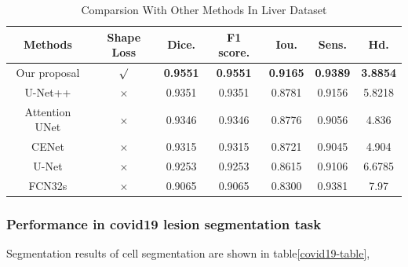 \documentclass[UTF8]{article} %
\begin{document}
  \begin{table}[H]
    \vspace{-2mm}
    \begin{center}\small
    \caption{Comparsion With Other Methods In Liver\cite{liver} Dataset}
    \label{liver-table}
    \begin{tabular}{ccccccc}
      
    \toprule
    Methods & Shape Loss & Dice. & F1 score. & Iou. & Sens. & Hd.\\
    \midrule
     Our proposal & $\surd$ & \textbf{0.9551} & \textbf{0.9551} & \textbf{0.9165} & \textbf{0.9389} & \textbf{3.8854}\\
     U-Net++ & $\times$ & 0.9351 & 0.9351 & 0.8781 & 0.9156 & 5.8218\\
     Attention UNet & $\times$ & 0.9346 & 0.9346 & 0.8776 & 0.9056 & 4.836\\
     CENet & $\times$ & 0.9315 & 0.9315 & 0.8721 & 0.9045 & 4.904\\
     U-Net & $\times$ & 0.9253 & 0.9253 & 0.8615 & 0.9106 & 6.6785\\
     FCN32s & $\times$ & 0.9065 & 0.9065 & 0.8300 & 0.9381 & 7.97\\
  \bottomrule    
    \end{tabular}
    \end{center}
    \vspace{-4mm}
  \end{table}

  

  \subsubsection{Performance in covid19 lesion segmentation task}
  Segmentation results of cell segmentation are shown in table\ref{covid19-table}, 
\end{document}
